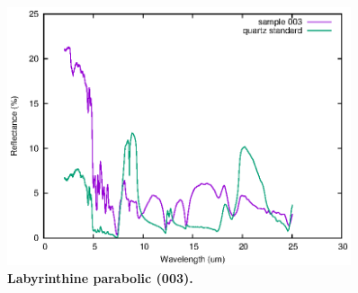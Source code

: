 \documentclass[10pt]{article}
\theoremstyle{definition}
\begin{document}
\begin{figure}
  \includegraphics[angle=0,width=0.9\textwidth]{003.eps}
\caption{\label{fig:003}\textbf{Labyrinthine parabolic (003).}}
\end{figure}
\end{document}
